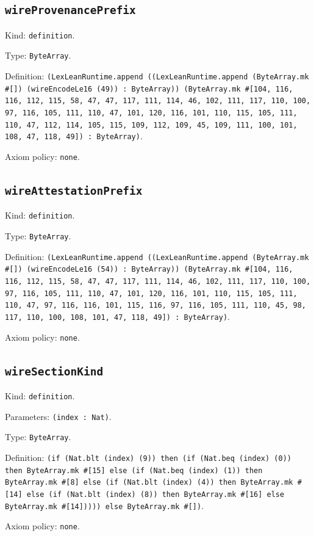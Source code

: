 \documentclass[11pt]{article}
\begin{document}
\subsection*{\texttt{wireProvenancePrefix}}
\noindent Kind: \texttt{definition}.\par
\noindent Type: \texttt{ByteArray}.\par
\noindent Definition: \texttt{(LexLeanRuntime.append ((LexLeanRuntime.append (ByteArray.mk \#[]) (wireEncodeLe16 (49)) : ByteArray)) (ByteArray.mk \#[104, 116, 116, 112, 115, 58, 47, 47, 117, 111, 114, 46, 102, 111, 117, 110, 100, 97, 116, 105, 111, 110, 47, 101, 120, 116, 101, 110, 115, 105, 111, 110, 47, 112, 114, 105, 115, 109, 112, 109, 45, 109, 111, 100, 101, 108, 47, 118, 49]) : ByteArray)}.\par
\noindent Axiom policy: \texttt{none}.\par
\subsection*{\texttt{wireAttestationPrefix}}
\noindent Kind: \texttt{definition}.\par
\noindent Type: \texttt{ByteArray}.\par
\noindent Definition: \texttt{(LexLeanRuntime.append ((LexLeanRuntime.append (ByteArray.mk \#[]) (wireEncodeLe16 (54)) : ByteArray)) (ByteArray.mk \#[104, 116, 116, 112, 115, 58, 47, 47, 117, 111, 114, 46, 102, 111, 117, 110, 100, 97, 116, 105, 111, 110, 47, 101, 120, 116, 101, 110, 115, 105, 111, 110, 47, 97, 116, 116, 101, 115, 116, 97, 116, 105, 111, 110, 45, 98, 117, 110, 100, 108, 101, 47, 118, 49]) : ByteArray)}.\par
\noindent Axiom policy: \texttt{none}.\par
\subsection*{\texttt{wireSectionKind}}
\noindent Kind: \texttt{definition}.\par
\noindent Parameters: \texttt{(index : Nat)}.\par
\noindent Type: \texttt{ByteArray}.\par
\noindent Definition: \texttt{(if (Nat.blt (index) (9)) then (if (Nat.beq (index) (0)) then ByteArray.mk \#[15] else (if (Nat.beq (index) (1)) then ByteArray.mk \#[8] else (if (Nat.blt (index) (4)) then ByteArray.mk \#[14] else (if (Nat.blt (index) (8)) then ByteArray.mk \#[16] else ByteArray.mk \#[14])))) else ByteArray.mk \#[])}.\par
\noindent Axiom policy: \texttt{none}.\par
\end{document}
